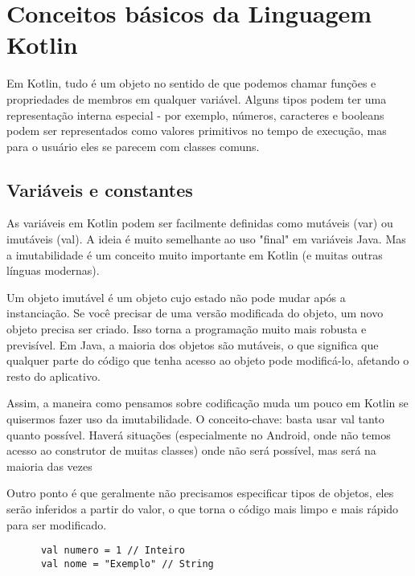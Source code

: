 

\chapter{ Conceitos b\'{a}sicos da Linguagem Kotlin}

Em Kotlin, tudo é um objeto no sentido de que 
podemos chamar funções e propriedades de membros
 em qualquer variável. Alguns tipos podem ter uma 
 representação interna especial - por exemplo, 
 números, caracteres e booleans podem ser 
 representados como valores primitivos no tempo 
 de execução, mas para o usuário eles se parecem
 com classes comuns.

    \section{Vari\'{a}veis e constantes}
      As variáveis em Kotlin podem ser facilmente 
    definidas como mutáveis (var) ou imutáveis (val).
    A ideia é muito semelhante ao uso "final" em variáveis Java.
    Mas a imutabilidade é um conceito muito importante em Kotlin (e muitas outras línguas modernas).
   
    Um objeto imutável é um objeto cujo estado não pode mudar 
    após a instanciação. Se você precisar de uma versão 
    modificada do objeto, um novo objeto precisa ser criado.
    Isso torna a programação muito mais robusta e previsível. 
    Em Java, a maioria dos objetos são mutáveis, o que significa
    que qualquer parte do código que tenha acesso ao objeto pode 
    modificá-lo, afetando o resto do aplicativo.

    Assim, a maneira como pensamos sobre codificação muda um pouco em Kotlin 
    se quisermos fazer uso da imutabilidade. O conceito-chave: basta usar 
    val tanto quanto possível. Haverá situações (especialmente no Android,
    onde não temos acesso ao construtor de muitas classes) onde não será 
    possível, mas será na maioria das vezes

    Outro ponto é que geralmente não precisamos 
    especificar tipos de objetos, eles serão inferidos a partir do 
    valor, o que torna o código mais limpo e mais rápido para ser modificado.
    \begin{lstlisting}
      val numero = 1 // Inteiro
      val nome = "Exemplo" // String  
    \end{lstlisting}



